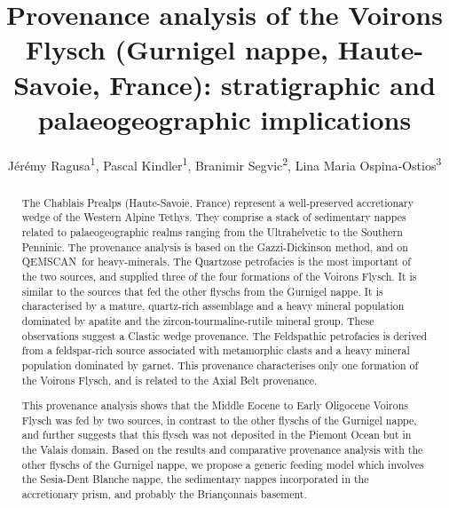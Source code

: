 \documentclass[twoside]{article}
\title{Provenance analysis of the Voirons Flysch (Gurnigel nappe, Haute-Savoie, France): stratigraphic and palaeogeographic implications}
\author{Jérémy Ragusa\textsuperscript{1}, Pascal Kindler\textsuperscript{1}, Branimir Segvic\textsuperscript{2}, Lina Maria Ospina‐Ostios\textsuperscript{3}}
\date{}
\makeatletter
\newcommand\registred{\textsuperscript{\tiny\textregistered}}
\renewcommand{\maketitle}{\bgroup\setlength{\parindent}{0pt}
\begin{flushleft}
  \Large{\textbf{\@title}}
  \bigskip
  
  \small{\@author}
\end{flushleft}\egroup
}
\makeatother
\begin{document}
\maketitle

\thispagestyle{firststyle}

\begin{flushleft}
{}
\end{flushleft}

\begin{abstract}
The Chablais Prealps (Haute-Savoie, France) represent a well-preserved accretionary wedge of the Western Alpine Tethys. They comprise a stack of sedimentary nappes related to palaeogeographic realms ranging from the Ultrahelvetic to the Southern Penninic. The provenance analysis is based on the Gazzi-Dickinson method, and on QEMSCAN\registred\ for heavy-minerals. The Quartzose petrofacies is the most important of the two sources, and supplied three of the four formations of the Voirons Flysch. It is similar to the sources that fed the other flyschs from the Gurnigel nappe. It is characterised by a mature, quartz-rich assemblage and a heavy mineral population dominated by apatite and the zircon-tourmaline-rutile mineral group. These observations suggest a Clastic wedge provenance. The Feldspathic petrofacies is derived from a feldspar-rich source associated with metamorphic clasts and a heavy mineral population dominated by garnet. This provenance characterises only one formation of the Voirons Flysch, and is related to the Axial Belt provenance.\par
This provenance analysis shows that the Middle Eocene to Early Oligocene Voirons Flysch was fed by two sources, in contrast to the other flyschs of the Gurnigel nappe, and further suggests that this flysch was not deposited in the Piemont Ocean but in the Valais domain. Based on the results and comparative provenance analysis with the other flyschs of the Gurnigel nappe, we propose a generic feeding model which involves the Sesia-Dent Blanche nappe, the sedimentary nappes incorporated in the accretionary prism, and probably the Briançonnais basement.
\end{abstract}
\end{document}
